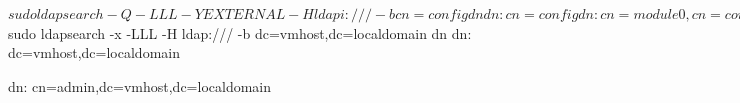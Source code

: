 \documentclass[mingoth,a4paper]{jsarticle}
\begin{document}
\begin{commandline}
$ sudo ldapsearch -Q -LLL -Y EXTERNAL -H ldapi:/// -b cn=config dn
dn: cn=config

dn: cn=module{0},cn=config

dn: cn=schema,cn=config

dn: cn={0}core,cn=schema,cn=config

dn: cn={1}cosine,cn=schema,cn=config

dn: cn={2}nis,cn=schema,cn=config

dn: cn={3}inetorgperson,cn=schema,cn=config

dn: olcBackend={0}hdb,cn=config

dn: olcDatabase={-1}frontend,cn=config

dn: olcDatabase={0}config,cn=config

dn: olcDatabase={1}hdb,cn=config

$ sudo ldapsearch -x -LLL -H ldap:/// -b dc=vmhost,dc=localdomain dn
dn: dc=vmhost,dc=localdomain

dn: cn=admin,dc=vmhost,dc=localdomain
\end{commandline}
\end{document}

